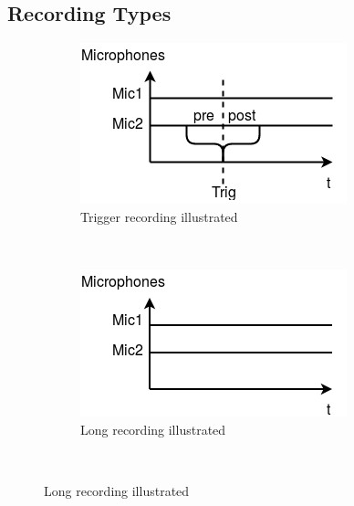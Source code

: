 \subsection{Recording Types} \label{sec:usecase:recordingtypes}
\begin{figure}[h!]
    \centering
    \begin{subfigure}[b]{0.3\textwidth}
        \includegraphics[width=\textwidth]{figures/recording_trigger.png}
        \caption{Trigger recording illustrated}
        \label{fig:usecase:triggerrecording}
    \end{subfigure}
    ~ %
    \begin{subfigure}[b]{0.3\textwidth}
        \includegraphics[width=\textwidth]{figures/recording_long.png}
        \caption{Long recording illustrated}
        \label{fig:usecase:longrecording}
    \end{subfigure}
    ~ %

\end{figure}
